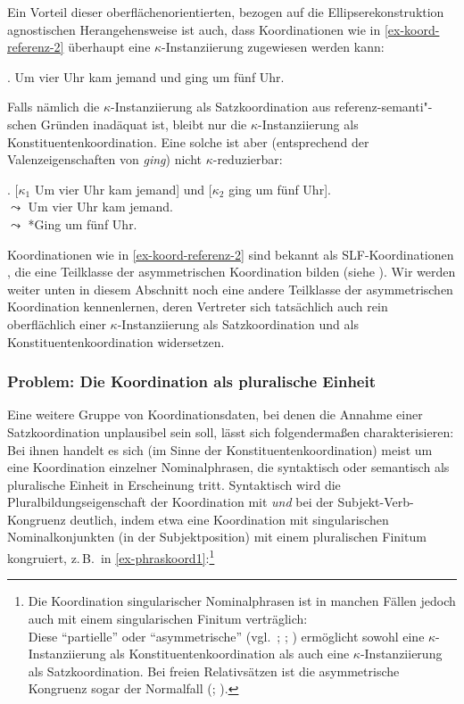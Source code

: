 Ein Vorteil dieser oberflächenorientierten, bezogen auf die Ellipserekonstruktion agnostischen Herangehensweise ist auch, dass Koordinationen wie in \ref{ex-koord-referenz-2} überhaupt eine $\kappa$-Instan\-ziierung zugewiesen werden kann:

\ex. \label{ex-koord-referenz-2}Um vier Uhr kam jemand und ging um fünf Uhr.

Falls nämlich die $\kappa$-Instanziierung als Satzkoordination aus referenz-semanti"-schen Gründen inadäquat ist, bleibt nur die $\kappa$-Instanziierung als Konstituentenkoordination. Eine solche ist aber (entsprechend der Valenzeigenschaften von {\it ging}) nicht $\kappa$-reduzierbar:

\ex. [$\kappa_1$ Um vier Uhr kam jemand] und [$\kappa_2$ ging um fünf Uhr]. \\
$\leadsto$ Um vier Uhr kam jemand. \\
$\leadsto$ *Ging um fünf Uhr.

Koordinationen wie in \ref{ex-koord-referenz-2} sind bekannt als SLF-Koordinationen \citep{Hoehle:83}, die eine Teilklasse der asymmetrischen Koordination bilden (siehe \citealt[1f]{Reich:09}). Wir werden weiter unten in diesem Abschnitt noch eine andere Teilklasse der asymmetrischen Koordination kennenlernen, deren Vertreter sich tatsächlich auch rein oberflächlich einer $\kappa$-Instanziierung als Satzkoordination und als Konstituentenkoordination widersetzen.   


\subsubsection*{Problem: Die Koordination als pluralische Einheit} \label{sec-plural}

Eine weitere Gruppe von Koordinationsdaten, bei denen die Annahme einer Satzkoordination unplausibel sein soll, lässt sich folgenderma\ss en charakterisieren: Bei ihnen handelt es sich (im Sinne der Konstituentenkoordination) meist um eine Koordination einzelner Nominalphrasen, die syntaktisch oder semantisch als pluralische Einheit in Erscheinung tritt. Syntaktisch wird die Pluralbildungseigenschaft der Koordination mit {\it und} bei der Subjekt-Verb-Kongruenz deutlich, indem etwa eine Koordination mit singularischen Nominalkonjunkten (in der Subjektposition) mit einem pluralischen Finitum kongruiert, z.\,B.\ in \ref{ex-phraskoord1}:\footnote{Die Koordination singularischer Nominalphrasen ist in manchen Fällen jedoch auch mit einem singularischen Finitum verträglich:\\
Diese "`partielle"' oder "`asymmetrische"'  (vgl.\ \citealt{Munn:00}; \citealt{Lorimor:07}; \citealt{Steiner:09}) ermöglicht sowohl eine $\kappa$-Instanziierung als Konstituentenkoordination als auch eine $\kappa$-Instanziierung als Satzkoordination. Bei freien Relativsätzen ist die asymmetrische Kongruenz sogar der Normalfall (\citealt[143]{Oppenrieder:91}; \citealt[Abschnitt~10.4.1.1]{Mueller:99}).}

